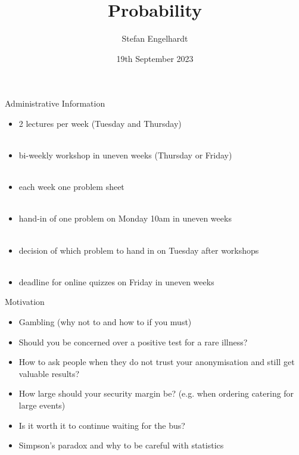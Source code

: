 \documentclass[11pt,pdf,ngerman,UKenglish]{beamer}%
\title{Probability}
\author{Stefan Engelhardt}
\date{19th September 2023}%
\newcommand{\1}{\mathbb{1}}
\theoremstyle{thm}
\theoremstyle{def}
\begin{document}
\begin{frame}
\titlepage
\end{frame}
\logo{}



\begin{frame}{Administrative Information}
\begin{itemize}
\item 2 lectures per week (Tuesday and Thursday) \\ \
\item bi-weekly workshop in uneven weeks (Thursday or Friday) \\ \
\item each week one problem sheet \\ \
\item hand-in of one problem on Monday 10am in uneven weeks \\ \
\item decision of which problem to hand in on Tuesday after workshops \\ \
\item deadline for online quizzes on Friday in uneven weeks
\end{itemize}
\end{frame}



\begin{frame}{Motivation}
\begin{itemize}
\item Gambling (why not to and how to if you must) \\
\item Should you be concerned over a positive test for a rare illness? \\
\item How to ask people when they do not trust your anonymisation and still get valuable results? \\
\item How large should your security margin be? (e.g. when ordering catering for large events) \\
\item Is it worth it to continue waiting for the bus? \\
\item Simpson's paradox and why to be careful with statistics
\end{itemize}
\end{frame}
\end{document}
